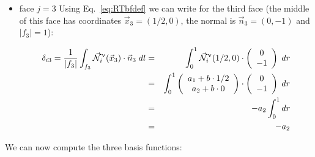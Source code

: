 \begin{itemize}
\item face $j=3$
Using Eq.~\eqref{eq:RTbfdef} we can write for the third face (the middle of this face has coordinates 
$\vec{x}_3=(1/2,0)$, the normal is $\vec{n}_3=(0,-1)$  and $|f_3|=1$):

\begin{eqnarray}
\delta_{i3}=
\frac{1}{|f_3|} \int_{f_3} \vec{{\mathcal{N}}}^\upnu_i( \vec{x}_3) \cdot \vec{n}_3 \; dl
&=& 
 \int_{0}^{1} \vec{{\mathcal{N}}}^\upnu_i( 1/2,0) \cdot \left(\begin{array}{c} 0 \\-1 \end{array}\right) \; dr \nonumber\\
&=&
 \int_{0}^{1} \left(\begin{array}{c} a_1+b\cdot 1/2 \\ a_2 + b \cdot 0 \end{array}\right) \cdot \left(\begin{array}{c} 0 \\ -1 \end{array}\right) \; dr \nonumber\\
&=& -  a_2 \int_{0}^{1}  dr \nonumber\\
&=& - a_2  \label{eq:RT0tri3}
\end{eqnarray}
\end{itemize}

We can now compute the three basis functions: 

